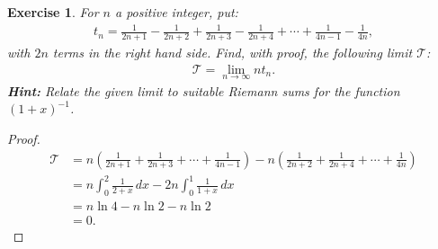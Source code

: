\documentclass[11pt]{article}
\newtheorem{exercise}{Exercise}[section]
\theoremstyle{definition}
\numberwithin{equation}{subsection}
\begin{document}
\begin{exercise}
For $n$ a positive integer, put:
\begin{align*}
    t_n = \frac{1}{2n + 1} - \frac{1}{2n + 2} + \frac{1}{2n + 3} - \frac{1}{2n + 4} + \cdots + \frac{1}{4n - 1} - \frac{1}{4n},
\end{align*}
with $2n$ terms in the right hand side. Find, with proof, the following limit $\mathcal{T}$:
\begin{align*}
    \mathcal{T} = \lim_{n\to\infty} nt_n.
\end{align*}
{\bf Hint:} {\em Relate the given limit to suitable Riemann sums for the function $(1 + x)^{-1}$.}
\end{exercise}
\begin{proof}
\begin{align*}
    \mathcal{T} & = n \left(\frac{1}{2n + 1} + \frac{1}{2n + 3} + \cdots + \frac{1}{4n - 1}\right) - n \left(\frac{1}{2n + 2} + \frac{1}{2n + 4} + \cdots +  \frac{1}{4n}\right) \\
    & = n \int^2_0 \frac{1}{2 + x}\, dx - 2n \int^1_0 \frac{1}{1 + x}\, dx \\
    & = n\ln 4 - n\ln 2 - n\ln 2 \\
    & = 0.
\end{align*}
\end{proof}

\medskip
\end{document}
